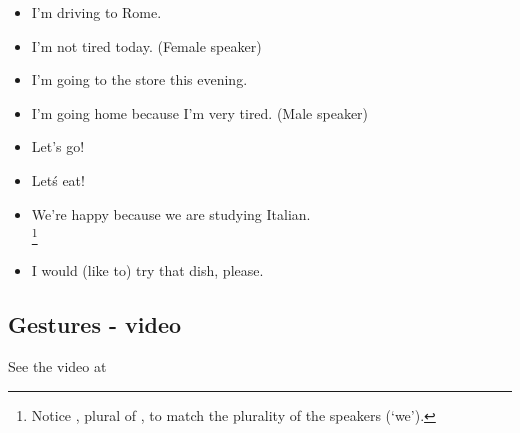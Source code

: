 \begin{itemize}
  \item I'm driving to Rome.                       \\
  \item I'm not tired today. (Female speaker)      \\
  \item I'm going to the store this evening.       \\
  \item I'm going home because I'm very tired. (Male speaker) \\
  \item Let's go!                                  \\
  \item Letś eat!                                  \\
  \item We're happy because we are studying Italian. \\
    \footnote{Notice , plural of , to match the plurality of the speakers (`we').}
  \item I would (like to) try that dish, please.   \\
\end{itemize}

\subsection{Gestures - video}
See the video at \cite{Virgallito}
